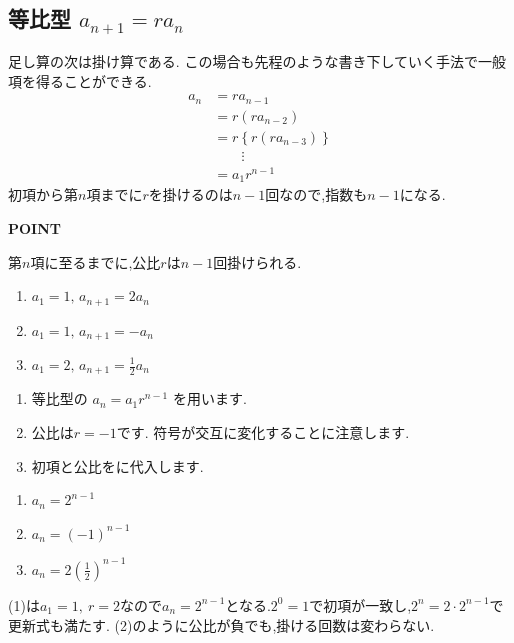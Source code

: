 
\subsection{\texorpdfstring{等比型  $a_{n+1}=ra_n$}{等比型}}\label{節：等比型}
足し算の次は掛け算である.
この場合も先程のような書き下していく手法で一般項を得ることができる.
\begin{align*}
  a_n&=ra_{n-1}\\
  &=r(ra_{n-2})\\
  &=r\left\{r(ra_{n-3})\right\}\\
  &\qquad \vdots\\
  &=a_1r^{n-1}
\end{align*}
初項から第$n$項までに$r$を掛けるのは$n-1$回なので,指数も$n-1$になる.
\begin{bookpoint}
  \textbf{POINT}\par
  第$n$項に至るまでに,公比$r$は$n-1$回掛けられる.
\end{bookpoint}

\noindent {}\par\nobreak
\begin{enumerate}[label=(\arabic*),parsep=3pt,format=\bookitemlink{example-geometric-1}{problem}{answer}]
  \item $\displaystyle a_1=1,\, a_{n+1}=2a_n$
  \item $\displaystyle a_1=1,\, a_{n+1}=-a_n$
  \item $\displaystyle a_1=2,\, a_{n+1}=\frac{1}{2}a_n$
\end{enumerate}

\noindent{}\par\nobreak
\begin{enumerate}[label=(\arabic*),parsep=3pt,format=\bookitemlink{example-geometric-1}{hint}{problem}]
  \item 等比型の
    $\displaystyle a_n=a_1r^{n-1}$
    を用います.
  \item 公比は$r=-1$です.
    符号が交互に変化することに注意します.
  \item 初項と公比をに代入します.
\end{enumerate}

\noindent{}\par\nobreak
\begin{enumerate}[label=(\arabic*),parsep=3pt,format=\bookitemlink{example-geometric-1}{answer}{problem}]
  \item $\displaystyle a_n=2^{n-1}$
  \item $\displaystyle a_n=(-1)^{n-1}$
  \item $\displaystyle a_n=2\left(\frac12\right)^{n-1}$
\end{enumerate}

\noindent{}\par\nobreak
(1)は$a_1=1,\ r=2$なので$a_n=2^{n-1}$となる.$2^0=1$で初項が一致し,$2^n=2\cdot2^{n-1}$で更新式も満たす.
(2)のように公比が負でも,掛ける回数は変わらない.
